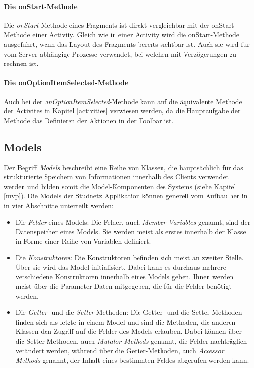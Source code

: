 \documentclass[../main.tex]{subfiles}
\begin{document}
	\paragraph{Die onStart-Methode}
	Die \emph{onStart}-Methode eines Fragments ist direkt vergleichbar mit der onStart-Methode einer Activity. Gleich wie in einer Activity wird die onStart-Methode ausgeführt, wenn das Layout des Fragments bereits sichtbar ist. Auch sie wird für vom Server abhängige Prozesse verwendet, bei welchen mit Verzögerungen zu rechnen ist.
	
	\paragraph{Die onOptionItemSelected-Methode}
	Auch bei der \emph{onOptionItemSelected}-Methode kann auf die äquivalente Methode der Activites in Kapitel \ref{activities} verwiesen werden, da die Hauptaufgabe der Methode das Definieren der Aktionen in der Toolbar ist.
	
	\subsection{Models} \label{models}
	Der Begriff \emph{Models} beschreibt eine Reihe von Klassen, die hauptsächlich für das strukturierte Speichern von Informationen innerhalb des Clients verwendet werden und bilden somit die Model-Komponenten des Systems (siehe Kapitel \ref{mvp}). Die Models der Studnetz Applikation können generell vom Aufbau her in in vier Abschnitte unterteilt werden:
	
	\begin{itemize}
		\item Die \emph{Felder} eines Models: Die Felder, auch \emph{Member Variables} genannt, sind der Datenspeicher eines Models. Sie werden meist als erstes innerhalb der Klasse in Forme einer Reihe von Variablen definiert. \cite{memberVariables}
		\item Die \emph{Konstruktoren}: Die Konstruktoren befinden sich meist an zweiter Stelle. Über sie wird das Model initialisiert. Dabei kann es durchaus mehrere verschiedene Konstruktoren innerhalb eines Models geben. Ihnen werden meist über die Parameter  Daten mitgegeben, die für die Felder benötigt werden.
		\item  Die \emph{Getter}- und die \emph{Setter}-Methoden: Die Getter- und die Setter-Methoden finden sich als letzte in einem Model und sind die Methoden, die anderen Klassen den Zugriff auf die Felder des Models erlauben. Dabei können über die Setter-Methoden, auch \emph{Mutator Methods} genannt, die Felder nachträglich verändert werden, während über die Getter-Methoden, auch \emph{Accessor Methods} genannt, der Inhalt eines bestimmten Feldes abgerufen werden kann. \cite{accessorsAndMutators}
	\end{itemize}
\end{document}
